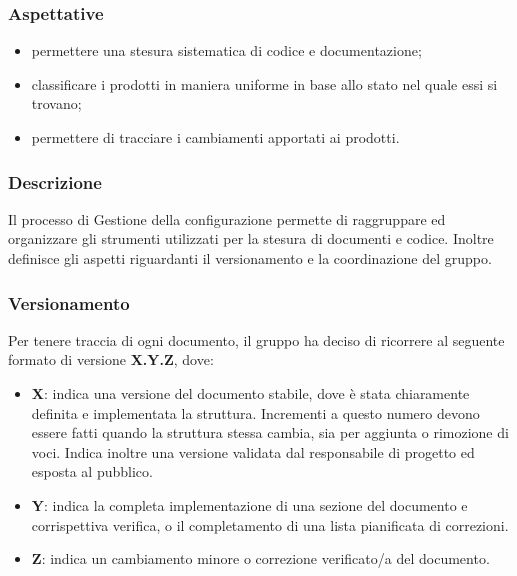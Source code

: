 		\subsubsection{Aspettative}
		\begin{itemize}
			\item permettere una stesura sistematica di codice e documentazione;
			\item classificare i prodotti in maniera uniforme in base allo stato nel quale essi si trovano;
			\item permettere di tracciare i cambiamenti apportati ai prodotti.
		\end{itemize}
		
		\subsubsection{Descrizione}
		Il processo di Gestione della configurazione permette di raggruppare ed organizzare gli strumenti utilizzati per la stesura di documenti e codice. Inoltre definisce gli aspetti riguardanti il versionamento e la coordinazione del gruppo.
		
		\subsubsection{Versionamento}
			
			Per tenere traccia di ogni documento, il gruppo ha deciso di ricorrere al seguente formato di versione \textbf{X.Y.Z}, dove:
			\begin{itemize}
				
				\item \textbf{X}: indica una versione del documento stabile, dove è stata chiaramente definita e implementata la struttura. Incrementi a questo numero devono essere fatti quando la struttura stessa cambia, sia per aggiunta o rimozione di voci. Indica inoltre una versione validata dal responsabile di progetto ed esposta al pubblico.
				
				\item \textbf{Y}: indica la completa implementazione di una sezione del documento e corrispettiva verifica, o il completamento di una lista pianificata di correzioni.
				
				\item \textbf{Z}: indica un cambiamento minore o correzione verificato/a del documento.
			\end{itemize}
			
